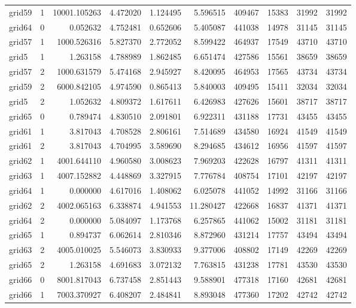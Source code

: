 \begin{longtable}{|l|r|r|r|r|r|r|r|r|r|}
grid59 & 1 & 10001.105263 & 4.472020 & 1.124495 & 5.596515 & 409467 & 15383 & 31992 & 31992 \\
grid64 & 0 & 0.052632 & 4.752481 & 0.652606 & 5.405087 & 441038 & 14978 & 31145 & 31145 \\
grid57 & 1 & 1000.526316 & 5.827370 & 2.772052 & 8.599422 & 464937 & 17549 & 43710 & 43710 \\
grid5 & 1 & 1.263158 & 4.788989 & 1.862485 & 6.651474 & 427586 & 15561 & 38659 & 38659 \\
grid57 & 2 & 1000.631579 & 5.474168 & 2.945927 & 8.420095 & 464953 & 17565 & 43734 & 43734 \\
grid59 & 2 & 6000.842105 & 4.974590 & 0.865413 & 5.840003 & 409495 & 15411 & 32034 & 32034 \\
grid5 & 2 & 1.052632 & 4.809372 & 1.617611 & 6.426983 & 427626 & 15601 & 38717 & 38717 \\
grid65 & 0 & 0.789474 & 4.830510 & 2.091801 & 6.922311 & 431188 & 17731 & 43455 & 43455 \\
grid61 & 1 & 3.817043 & 4.708528 & 2.806161 & 7.514689 & 434580 & 16924 & 41549 & 41549 \\
grid61 & 2 & 3.817043 & 4.704995 & 3.589690 & 8.294685 & 434612 & 16956 & 41597 & 41597 \\
grid62 & 1 & 4001.644110 & 4.960580 & 3.008623 & 7.969203 & 422628 & 16797 & 41311 & 41311 \\
grid63 & 1 & 4007.152882 & 4.448869 & 3.327915 & 7.776784 & 408754 & 17101 & 42197 & 42197 \\
grid64 & 1 & 0.000000 & 4.617016 & 1.408062 & 6.025078 & 441052 & 14992 & 31166 & 31166 \\
grid62 & 2 & 4002.065163 & 6.338874 & 4.941553 & 11.280427 & 422668 & 16837 & 41371 & 41371 \\
grid64 & 2 & 0.000000 & 5.084097 & 1.173768 & 6.257865 & 441062 & 15002 & 31181 & 31181 \\
grid65 & 1 & 0.894737 & 6.062614 & 2.810346 & 8.872960 & 431214 & 17757 & 43494 & 43494 \\
grid63 & 2 & 4005.010025 & 5.546073 & 3.830933 & 9.377006 & 408802 & 17149 & 42269 & 42269 \\
grid65 & 2 & 1.263158 & 4.691683 & 3.072132 & 7.763815 & 431238 & 17781 & 43530 & 43530 \\
grid66 & 0 & 8001.817043 & 6.737458 & 2.851443 & 9.588901 & 477318 & 17160 & 42681 & 42681 \\
grid66 & 1 & 7003.370927 & 6.408207 & 2.484841 & 8.893048 & 477360 & 17202 & 42742 & 42742 \\

\end{longtable}
